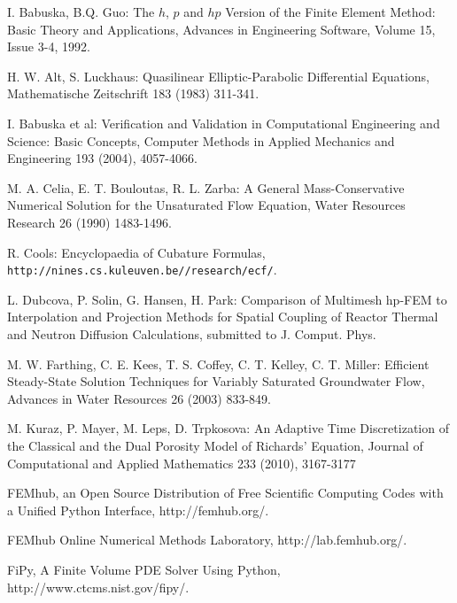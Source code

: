 \documentclass[final,3p,times,twocolumn]{elsarticle}
\begin{document}


\begin{thebibliography}{00}

I. Babuska, B.Q. Guo: The $h$, $p$ and $hp$ Version of the Finite Element Method: Basic Theory and Applications, 
Advances in Engineering Software, Volume 15, Issue 3-4, 1992.

     H. W. Alt, S. Luckhaus: Quasilinear Elliptic-Parabolic Differential Equations, Mathematische Zeitschrift 183 (1983) 311-341.

I. Babuska et al: Verification and Validation in Computational Engineering and Science: Basic Concepts,
Computer Methods in Applied Mechanics and Engineering 193 (2004), 4057-4066.

M. A. Celia, E. T. Bouloutas, R. L. Zarba: A General Mass-Conservative Numerical Solution for the Unsaturated Flow Equation, Water Resources Research 26 (1990) 1483-1496.

    R. Cools: Encyclopaedia of Cubature Formulas, {\tt http://nines.cs.kuleuven.be//research/ecf/}.

L. Dubcova, P. Solin, G. Hansen, H. Park: Comparison of Multimesh hp-FEM to Interpolation and 
Projection Methods for Spatial Coupling of Reactor Thermal and Neutron Diffusion Calculations, 
submitted to J. Comput. Phys.

M. W. Farthing, C. E. Kees, T. S. Coffey, C. T. Kelley, C. T. Miller: Efficient Steady-State Solution Techniques for Variably Saturated Groundwater Flow, Advances in Water Resources 26 (2003) 833-849.

  M. Kuraz, P. Mayer, M. Leps, D. Trpkosova: An Adaptive Time Discretization of the Classical and the Dual Porosity Model of Richards' Equation, Journal of Computational and 
Applied Mathematics 233 (2010), 3167-3177

FEMhub, an Open Source Distribution of Free Scientific Computing Codes 
with a Unified Python Interface, http://femhub.org/.

FEMhub Online Numerical Methods Laboratory, http://lab.femhub.org/.

FiPy, A Finite Volume PDE Solver Using Python, http://www.ctcms.nist.gov/fipy/.


\end{thebibliography}
\end{document}
